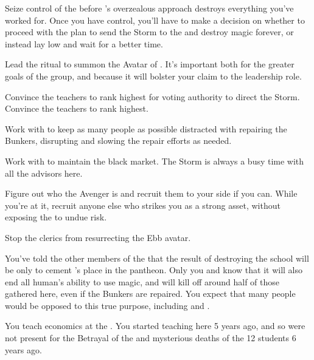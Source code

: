 \documentclass[char]{GL2020}
\begin{document}
\begin{itemz}
	\item Seize control of the \pGoaties{} before \cChupLeader{}'s overzealous approach destroys everything you've worked for. Once you have control, you'll have to make a decision on whether to proceed with the plan to send the Storm to the \pSc{} and destroy magic forever, or instead lay low and wait for a better time.
	\item Lead the ritual to summon the Avatar of \cGenesis{}. It's important both for the greater goals of the group, and because it will bolster your claim to the leadership role.
	\item Convince the \pTech{} teachers to rank \cChupStudent{} highest for voting authority to direct the Storm. Convince the \pFarm{} teachers to rank \cPirateChild{\full} highest.
	\item Work with \cChupStudent{} to keep as many people as possible distracted with repairing the Bunkers, disrupting and slowing the repair efforts as needed. 
	\item Work with \cChupInventor{} to maintain the black market. The Storm is always a busy time with all the advisors here.
	\item Figure out who the Avenger is and recruit them to your side if you can. While you're at it, recruit anyone else who strikes you as a strong asset, without exposing the \pGoaties{} to undue risk.
	\item Stop the \pShip{} clerics from resurrecting the Ebb avatar.
\end{itemz}

\begin{itemz}[Notes]
	\item You've told the other members of the \pGoaties{} that the result of destroying the school will be only to cement \cGenesis{}'s place in the pantheon. Only you and \cChupLeader{} know that it will also end all human's ability to use magic, and will kill off around half of those gathered here, even if the Bunkers are repaired. You expect that many people would be opposed to this true purpose, including \cChupInventor{} and \cChupStudent{}.
	\item You teach economics at the \pSchool{}. You started teaching here 5 years ago, and so were not present for the Betrayal of the \pShip{} and mysterious deaths of the 12 students 6 years ago.
\end{itemz}
\end{document}
